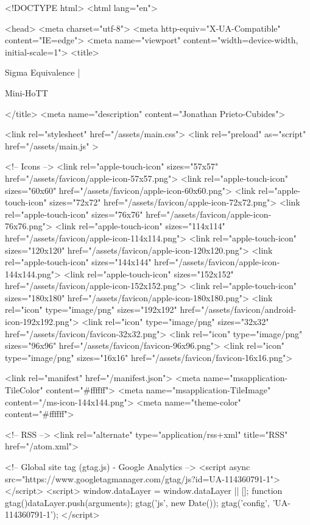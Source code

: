 <!DOCTYPE html>
<html lang="en">

<head>
  <meta charset="utf-8">
  <meta http-equiv="X-UA-Compatible" content="IE=edge">
  <meta name="viewport" content="width=device-width, initial-scale=1">
  <title>
    
      
        Sigma Equivalence |
      
        Mini-HoTT
    
  </title>
  <meta name="description" content="Jonathan Prieto-Cubides">

  <link rel="stylesheet" href="/assets/main.css">
  <link rel="preload" as="script" href="/assets/main.js" >

  <!-- Icons -->
  <link rel="apple-touch-icon" sizes="57x57" href="/assets/favicon/apple-icon-57x57.png">
  <link rel="apple-touch-icon" sizes="60x60" href="/assets/favicon/apple-icon-60x60.png">
  <link rel="apple-touch-icon" sizes="72x72" href="/assets/favicon/apple-icon-72x72.png">
  <link rel="apple-touch-icon" sizes="76x76" href="/assets/favicon/apple-icon-76x76.png">
  <link rel="apple-touch-icon" sizes="114x114" href="/assets/favicon/apple-icon-114x114.png">
  <link rel="apple-touch-icon" sizes="120x120" href="/assets/favicon/apple-icon-120x120.png">
  <link rel="apple-touch-icon" sizes="144x144" href="/assets/favicon/apple-icon-144x144.png">
  <link rel="apple-touch-icon" sizes="152x152" href="/assets/favicon/apple-icon-152x152.png">
  <link rel="apple-touch-icon" sizes="180x180" href="/assets/favicon/apple-icon-180x180.png">
  <link rel="icon" type="image/png" sizes="192x192"  href="/assets/favicon/android-icon-192x192.png">
  <link rel="icon" type="image/png" sizes="32x32" href="/assets/favicon/favicon-32x32.png">
  <link rel="icon" type="image/png" sizes="96x96" href="/assets/favicon/favicon-96x96.png">
  <link rel="icon" type="image/png" sizes="16x16" href="/assets/favicon/favicon-16x16.png">

  <link rel="manifest" href="/manifest.json">
  <meta name="msapplication-TileColor" content="#ffffff">
  <meta name="msapplication-TileImage" content="/ms-icon-144x144.png">
  <meta name="theme-color" content="#ffffff">

  <!-- RSS -->
  <link rel="alternate" type="application/rss+xml" title="RSS" href="/atom.xml">

  <!-- Global site tag (gtag.js) - Google Analytics -->
  <script async src="https://www.googletagmanager.com/gtag/js?id=UA-114360791-1"></script>
  <script>
    window.dataLayer = window.dataLayer || [];
    function gtag(){dataLayer.push(arguments);}
    gtag('js', new Date());
    gtag('config', 'UA-114360791-1');
  </script>

